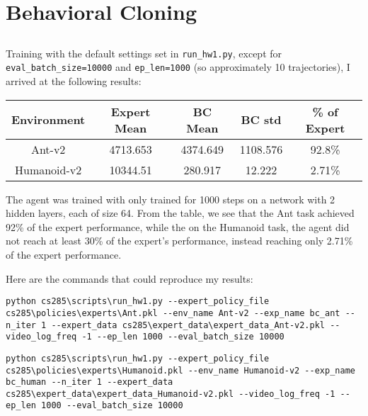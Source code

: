 \documentclass[10pt,a4paper]{article}
\begin{document}
\section{Behavioral Cloning}
\subsection{}

Training with the default settings set in \texttt{run\_hw1.py}, except for \texttt{eval\_batch\_size=10000} and 
\texttt{ep\_len=1000} (so approximately 10 trajectories), I arrived at the following results:

\begin{center}
\begin{tabular}{|c|c|c|c|c|}
	\hline
	Environment & Expert Mean & BC Mean & BC std & \% of Expert \\
	\hline
	Ant-v2 & 4713.653 & 4374.649 & 1108.576 & 92.8\% \\
	\hline
	Humanoid-v2 & 10344.51 & 280.917 & 12.222 & 2.71\% \\
	\hline

\end{tabular}
\end{center}

\noindent
The agent was trained with only trained for 1000 steps on a network with 2 hidden layers, 
each of size 64. From the table, we see that the Ant task achieved 92\% of the
expert performance, while the on the Humanoid task, the agent did not reach at least 30\% 
of the expert's performance, instead reaching only 2.71\% of the expert performance. 

\noindent
Here are the commands that could reproduce my results:


\begin{lstlisting}[caption=Ant task]
python cs285\scripts\run_hw1.py --expert_policy_file cs285\policies\experts\Ant.pkl --env_name Ant-v2 --exp_name bc_ant --n_iter 1 --expert_data cs285\expert_data\expert_data_Ant-v2.pkl --video_log_freq -1 --ep_len 1000 --eval_batch_size 10000
\end{lstlisting}

\begin{lstlisting}[caption=Humanoid task]
python cs285\scripts\run_hw1.py --expert_policy_file cs285\policies\experts\Humanoid.pkl --env_name Humanoid-v2 --exp_name bc_human --n_iter 1 --expert_data cs285\expert_data\expert_data_Humanoid-v2.pkl --video_log_freq -1 --ep_len 1000 --eval_batch_size 10000
\end{lstlisting}
\end{document}
